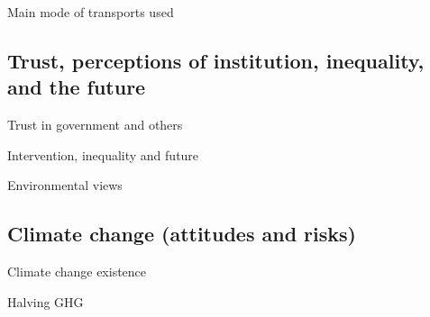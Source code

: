 \documentclass{article}
\begin{document}
\begin{landscape}
\begin{table}[h!]
	\caption{Main mode of transports used}
	\begin{center}
		\scalebox{0.6}{}
	\end{center}
\end{table}	
\end{landscape}

\clearpage
\subsection{Trust, perceptions of institution, inequality, and the future}

\begin{table}[h!]
	\caption{Trust in government and others}
	\begin{center}
		\scalebox{0.7}{}
	\end{center}
\end{table}	

\begin{table}[h!]
	\caption{Intervention, inequality and future}
	\begin{center}
		\scalebox{0.7}{}
	\end{center}
\end{table}	

\begin{table}[h!]
	\caption{Environmental views}
	\begin{center}
		\scalebox{0.7}{}
	\end{center}
\end{table}	

\clearpage
\subsection{Climate change (attitudes and risks)}


\begin{table}[h!]
	\caption{Climate change existence}
	\begin{center}
		\scalebox{0.7}{}
	\end{center}
\end{table}		

\begin{table}[h!]
	\caption{Halving GHG}
	\begin{center}
		\scalebox{0.7}{}
	\end{center}
\end{table}
\end{document}
